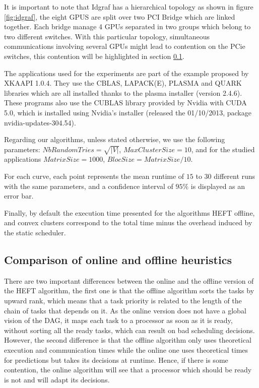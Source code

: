 \documentclass[10pt, conference, compsocconf,pdftex,dvipsnames]{IEEEtran}
\begin{document}
It is important to note that Idgraf has a hierarchical topology as shown in
figure \ref{fig:idgraf}, the eight GPUS are split over two PCI Bridge which
are linked together. Each bridge manage 4 GPUs separated in two groups which
belong to two different switches. With this particular topology, simultaneous
communications involving several GPUs might lead to contention on the PCie
switches, this contention will be highlighted in section
\ref{sec:exp-exp-perf}.

The applications used for the experiments are part of the example proposed by
XKAAPI 1.0.4. They use the CBLAS, LAPACK(E), PLASMA and QUARK libraries which
are all installed thanks to the plasma installer (version 2.4.6)\cite{PLASMA}.
These programs also use the CUBLAS library provided by Nvidia with CUDA 5.0,
which is installed using Nvidia's installer (released the 01/10/2013, 
package nvidia-updates-304.54).


Regarding our algorithms, unless stated otherwise, we use the following
parameters: $NbRandomTries=\sqrt{|V|}$, $MaxClusterSize=10$, and for the
studied applications $MatrixSize=1000$, $BlocSize=MatrixSize/10$. 

For each curve, each point represents the
mean runtime of $15$ to $30$ different runs with the same parameters, and a
confidence interval of $95\%$ is displayed as an error bar.

Finally, by default the execution time presented for the algorithms HEFT
offline, and convex clusters correspond to the total time minus the overhead
induced by the static scheduler.

\subsection{Comparison of online and offline heuristics}
\label{sec:exp-exp-perf}

There are two important differences between the online and the offline version
of the HEFT algorithm, the first one is that the offline algorithm sorts the
tasks by upward rank, which means that a task priority is related to the
length of the chain of tasks that depends on it. As the online version does
not have a global vision of the DAG, it maps each task to a processor as soon
as it is ready, without sorting all the ready tasks, which can result on bad
scheduling decisions.  However, the second difference is that the offline
algorithm only uses theoretical execution and communication times while the
online one uses theoretical times for predictions but takes its decisions at
runtime. Hence, if there is some contention, the online algorithm will see
that a processor which should be ready is not and will adapt its decisions.
\end{document}
